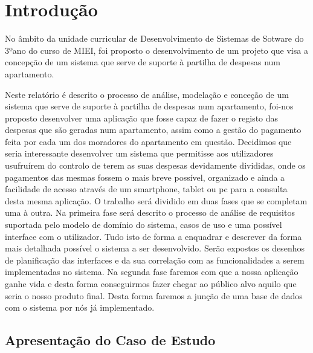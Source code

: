 \chapter{Introdução}

No âmbito da unidade curricular de Desenvolvimento de Sistemas de Sotware do 3ºano do curso de MIEI,  foi proposto o desenvolvimento de um projeto que visa a concepção de um sistema que serve de suporte à partilha de despesas num apartamento.

Neste relatório é descrito o processo de análise, modelação e conceção de um sistema que serve de suporte à partilha de despesas num apartamento, foi-nos proposto desenvolver uma aplicação que fosse capaz de fazer o registo das despesas que são geradas num apartamento, assim como a gestão do pagamento feita por cada um dos moradores do apartamento em questão.
Decidimos que seria interessante desenvolver um sistema que permitisse aos utilizadores usufruírem do controlo de terem as suas despesas devidamente divididas, onde os pagamentos das mesmas fossem o mais breve possível, organizado e ainda a facilidade de acesso através de um smartphone, tablet ou pc para a consulta desta mesma aplicação. O trabalho será dividido em duas fases que se completam uma à outra.
Na primeira fase será descrito o processo de análise de requisitos suportada pelo modelo de domínio do sistema, casos de uso e uma possível interface com o utilizador. Tudo isto de forma a enquadrar e descrever da forma mais detalhada possível o sistema a ser desenvolvido. Serão expostos os desenhos de planificação das interfaces e da sua correlação com as funcionalidades a serem implementadas no sistema.
Na segunda fase faremos com que a nossa aplicação ganhe vida e desta forma conseguirmos fazer chegar ao público alvo aquilo que seria o nosso produto final. Desta forma faremos a junção de uma base de dados com o sistema por nós já implementado.

\section{Apresentação do Caso de Estudo}


